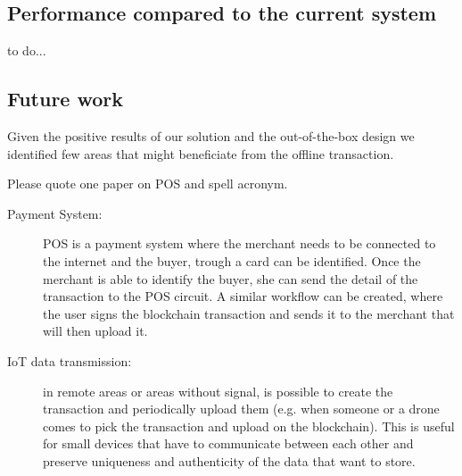 \subsection{Performance compared to the current system}

\begin{notation}
    to do... \\
\end{notation}


\subsection{Future work}

Given the positive results of our solution and the out-of-the-box design we identified few areas that might beneficiate from the offline transaction.


\begin{notation}
    Please quote one paper on POS and spell acronym.
\end{notation}

\begin{description}
    
    \item[Payment System:] POS is a payment system where the merchant needs to be connected to the internet and the buyer, trough a card can be identified. Once the merchant is able to identify the buyer, she can send the detail of the transaction to the POS circuit.
    A similar workflow can be created, where the user signs the blockchain transaction and sends it to the merchant that will then upload it.

    \item[IoT data transmission:] in remote areas or areas without signal, is possible to create the transaction and periodically upload them (e.g. when someone or a drone comes to pick the transaction and upload on the blockchain). This is useful for small devices that have to communicate between each other and preserve uniqueness and authenticity of the data that want to store.
    
\end{description}
